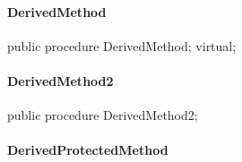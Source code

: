 \documentclass{report}
\newif\ifpdf
\begin{document}
\paragraph*{DerivedMethod}\hspace*{\fill}

\label{ok_inherited_members.TDerived-DerivedMethod}
\begin{list}{}{
\setlength{\itemindent}{0cm}
\setlength{\listparindent}{0cm}
\setlength{\leftmargin}{\evensidemargin}
\addtolength{\leftmargin}{\tmplength}
\settowidth{\labelsep}{X}
\addtolength{\leftmargin}{\labelsep}
\setlength{\labelwidth}{\tmplength}
}
\item[\textbf{Declaration}\hfill]
\ifpdf
\begin{flushleft}
\fi
\begin{ttfamily}
public procedure DerivedMethod; virtual;\end{ttfamily}

\ifpdf
\end{flushleft}
\fi

\end{list}
\paragraph*{DerivedMethod2}\hspace*{\fill}

\label{ok_inherited_members.TDerived-DerivedMethod2}
\begin{list}{}{
\setlength{\itemindent}{0cm}
\setlength{\listparindent}{0cm}
\setlength{\leftmargin}{\evensidemargin}
\addtolength{\leftmargin}{\tmplength}
\settowidth{\labelsep}{X}
\addtolength{\leftmargin}{\labelsep}
\setlength{\labelwidth}{\tmplength}
}
\item[\textbf{Declaration}\hfill]
\ifpdf
\begin{flushleft}
\fi
\begin{ttfamily}
public procedure DerivedMethod2;\end{ttfamily}

\ifpdf
\end{flushleft}
\fi

\end{list}
\paragraph*{DerivedProtectedMethod}\hspace*{\fill}
\end{document}
